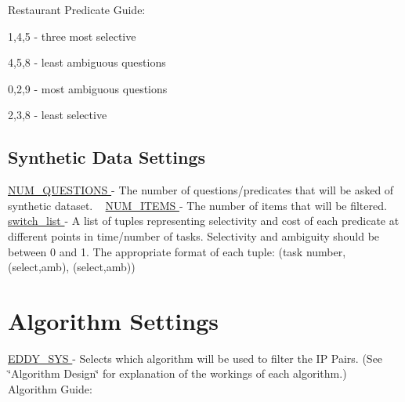 Restaurant Predicate Guide\+:
\begin{DoxyItemize}
\item 1,4,5 -\/ three most selective
\item 4,5,8 -\/ least ambiguous questions
\item 0,2,9 -\/ most ambiguous questions
\item 2,3,8 -\/ least selective ~\newline
 
\end{DoxyItemize}\hypertarget{toggles_syndata}{}\subsection{Synthetic Data Settings}\label{toggles_syndata}
\hyperlink{namespacedynamicfilterapp_1_1toggles_a6e9b8f89b507e81efe828c45c51e3906}{N\+U\+M\+\_\+\+Q\+U\+E\+S\+T\+I\+O\+NS } -\/ The number of questions/predicates that will be asked of synthetic dataset. ~\newline
 \hyperlink{namespacedynamicfilterapp_1_1toggles_a0948720f253a5f2fc7689b2968c8b619}{N\+U\+M\+\_\+\+I\+T\+E\+MS } -\/ The number of items that will be filtered. ~\newline
 \hyperlink{namespacedynamicfilterapp_1_1toggles_abbafede9e00a5523a3cfea9fc4ff4764}{switch\+\_\+list } -\/ A list of tuples representing selectivity and cost of each predicate at different points in time/number of tasks. Selectivity and ambiguity should be between 0 and 1. The appropriate format of each tuple\+: (task number, (select,amb), (select,amb)) ~\newline
 \hypertarget{toggles_alg}{}\section{Algorithm Settings}\label{toggles_alg}
\hyperlink{namespacedynamicfilterapp_1_1toggles_a549d2c90f3f5922ad1442df2113fca1b}{E\+D\+D\+Y\+\_\+\+S\+YS } -\/ Selects which algorithm will be used to filter the IP Pairs. (See \char`\"{}\+Algorithm Design\char`\"{} for explanation of the workings of each algorithm.) ~\newline
Algorithm Guide\+:
